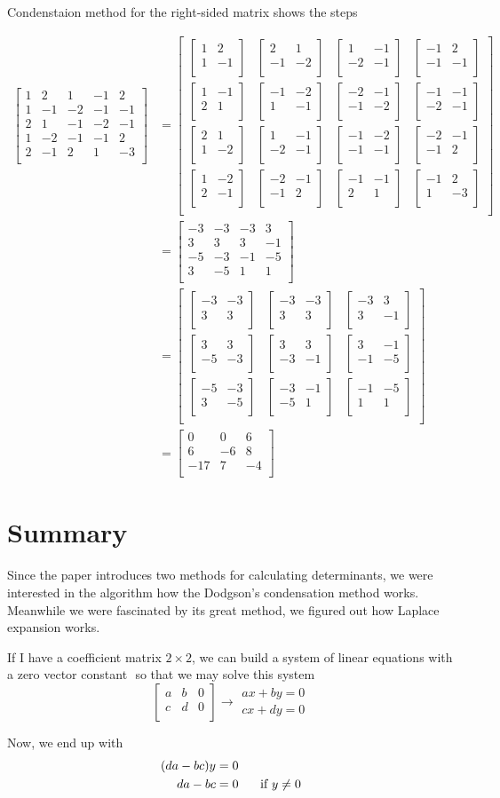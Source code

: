 \documentclass[12pt]{article}
\newcommand{\matxx}[2] {
\begin{bmatrix}
  #1 \\
  #2 \\
\end{bmatrix}
}
\newcommand{\matxxx}[3] {
\begin{bmatrix}
  #1 \\
  #2 \\
  #3 \\
\end{bmatrix}
}
\newcommand{\matxxxx}[4] {
\begin{bmatrix}
  #1 \\
  #2 \\
  #3 \\
  #4 \\
\end{bmatrix}
}
\newcommand{\matxxxxx}[5] {
\begin{bmatrix}
  #1 \\
  #2 \\
  #3 \\
  #4 \\
  #5 \\
\end{bmatrix}
}
\newcommand{\arrow}[1] {\xrightarrow[]{\text{#1}}}
\begin{document}
Condenstaion method for the right-sided matrix shows the steps

\[
  \begin{split}
    \matxxxxx
    {1 &  2 & 1 &  -1 &  2}
    {1 & -1 & -2 & -1 & -1}
    {2 &  1 & -1 & -2 & -1}
    {1 & -2 & -1 & -1 &  2}
    {2 & -1 &  2 &  1 & -3}
    & = \matxxxx
    {
      \matxx{1 & 2}{1 & -1} &
      \matxx{2 & 1}{-1 & -2} &
      \matxx{1 & -1}{-2 & -1} &
      \matxx{-1 & 2}{-1 & -1}
    }
    {
      \matxx{1 & -1}{2 & 1} &
      \matxx{-1 & -2}{1 & -1} &
      \matxx{-2 & -1}{-1 & -2} &
      \matxx{-1 & -1}{-2 & -1}
    }
    {
      \matxx{2 & 1}{1 & -2} &
      \matxx{1 & -1}{-2 & -1} &
      \matxx{-1 & -2}{-1 & -1} &
      \matxx{-2 & -1}{-1 & 2}
    }
    {
      \matxx{1 & -2}{2 & -1} &
      \matxx{-2 & -1}{-1 & 2} &
      \matxx{-1 & -1}{2 & 1} &
      \matxx{-1 & 2}{1 & -3}
    } \\
    & = \matxxxx
    {-3 & -3 & -3 &  3}
    {3 &  3 &  3 & -1}
    {-5 & -3 & -1 & -5}
    {3 & -5 &  1 &  1} \\
    & = \matxxx
    {
      \matxx{-3 & -3}{3 & 3} &
      \matxx{-3 & -3}{3 & 3} &
      \matxx{-3 & 3}{3 & -1}
    }
    {
      \matxx{3 & 3}{-5 & -3} &
      \matxx{3 & 3}{-3 & -1} &
      \matxx{3 & -1}{-1 & -5}
    }
    {
      \matxx{-5 & -3}{3 & -5} &
      \matxx{-3 & -1}{-5 & 1} &
      \matxx{-1 & -5}{1 & 1}
    } \\
    & = \matxxx{0 & 0 & 6}{6 & -6 & 8}{-17 & 7 & -4}
  \end{split}
\]

\pagebreak

\section{Summary}

Since the paper introduces two methods for calculating determinants,
we were interested in the algorithm how the Dodgson's condensation method works.
Meanwhile we were fascinated by its great method, we figured out how Laplace expansion works.

If I have a coefficient matrix \(2 \times 2\), we can build a system of linear equations with a zero vector constant \(\)
so that we may solve this system
\[
  \matxx{a & b & 0}{c & d & 0}
  \arrow{}
  \begin{matrix}
    ax + by = 0 \\
    cx + dy = 0
  \end{matrix}
\]

Now, we end up with
\[
  \begin{split}
    (da - bc)y  & = 0 \\
    da - bc & = 0 \hspace{0.5cm} \mbox{ if } y \neq 0
  \end{split}
\]
\end{document}
